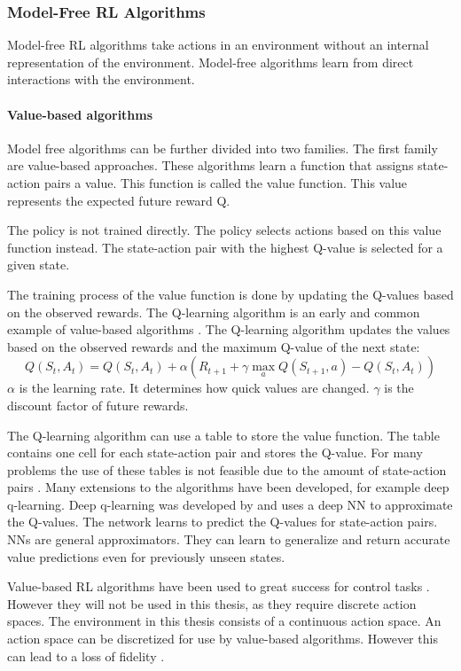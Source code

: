 \subsubsection{Model-Free \ac{RL} Algorithms}

Model-free \ac{RL} algorithms take actions in an environment without an internal representation of the environment. Model-free algorithms learn from direct interactions with the environment.

\paragraph{Value-based algorithms}
Model free algorithms can be further divided into two families. The first family are value-based approaches. These algorithms learn a function that assigns state-action pairs a value. This function is called the value function. This value represents the expected future reward Q.
 
The policy is not trained directly. The policy selects actions based on this value function instead. The state-action pair with the highest Q-value is selected for a given state.

The training process of the value function is done by updating the Q-values based on the observed rewards. The Q-learning algorithm is an early and common example of value-based algorithms \textcite{rlbook2020}. The Q-learning algorithm updates the values based on the observed rewards and the maximum Q-value of the next state: \[Q(S_t, A_t) = Q(S_t, A_t) + \alpha (R_{t+1} + \gamma \max_a Q(S_{t+1}, a) - Q(S_t, A_t))\]
$\alpha$ is the learning rate. It determines how quick values are changed. $\gamma$ is the discount factor of future rewards.


The Q-learning algorithm can use a table to store the value function. The table contains one cell for each state-action pair and stores the Q-value. 
For many problems the use of these tables is not feasible due to the amount of state-action pairs \autocite{rlbook2020}. Many extensions to the algorithms have been developed, for example deep q-learning. Deep q-learning was developed by \textcite{atari} and uses a deep \ac{NN} to approximate the Q-values. The network learns to predict the Q-values for state-action pairs. \acp{NN} are general approximators. They can learn to generalize and return accurate value predictions even for previously unseen states. 

Value-based \ac{RL} algorithms have been used to great success for control tasks \textcite{rlbook2020}. However they will not be used in this thesis, as they require discrete action spaces. The environment in this thesis consists of a continuous action space.
An action space can be discretized for use by value-based algorithms. However this can lead to a loss of fidelity \autocite{drl_for_ad}.


